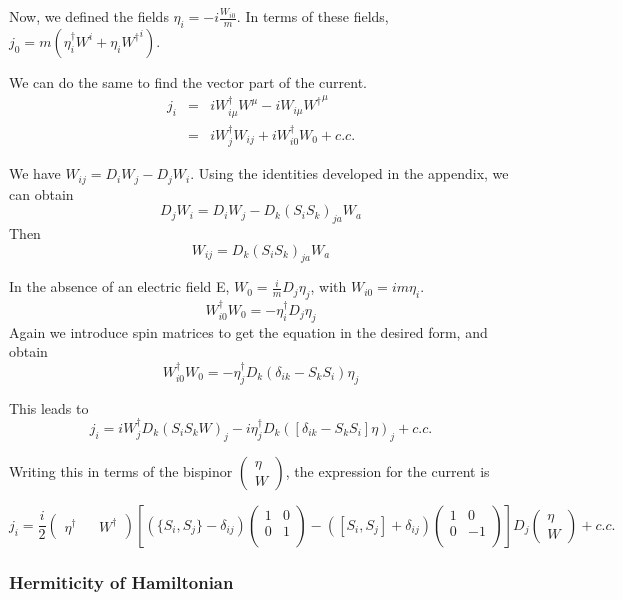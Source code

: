 Now, we defined the fields $\eta_i = -i \frac{W_{i0}}{m}$.  In terms of these fields,
$j_0 =  m (\eta_i^\dagger  W^i + \eta_i {W^\dagger}^i )$. 

We can do the same to find the vector part of the current.
\begin{eqnarray*}
	j_i &=& i W_{i \mu}^\dagger W^{\mu} - i W_{i \mu} {W^{\dagger}}^\mu 	\\
	&=&	i W_j^\dagger W_{ij}  + i W_{i0}^\dagger W_0 + c.c.
\end{eqnarray*}

We have $W_{ij} = D_i W_j - D_j W_i$.  Using the identities developed in the appendix, we can obtain
\[ D_j W_i = D_i W_j - D_k(S_i S_k)_{ja} W_a 	\]
Then
\[ W_{ij} = D_k (S_i S_k)_{ja} W_a 	\]

In the absence of an electric field E, $W_{0} = \frac{i}{m} D_j \eta_j$, with $W_{i0} = i m \eta_i$.
\[	W_{i0}^\dagger W_0 = - \eta_i^\dagger D_j \eta_j 	\]
Again we introduce spin matrices to get the equation in the desired form, and obtain
\[	W_{i0}^\dagger W_0 = - \eta_j^\dagger D_k (\delta_{ik} - S_k S_i) \eta_j 	\]

This leads to
\[ j_i = i W_j^\dagger D_k (S_i S_k W)_j - i \eta_j^\dagger D_k ([\delta_{ik} - S_k S_i]\eta)_j + c.c. \]

Writing this in terms of the bispinor $\begin{pmatrix}\eta \\ W\end{pmatrix}$, the expression for the current is

\begin{equation}	j_i	=
		\frac{i}{2} \begin{pmatrix}\eta^\dagger && W^\dagger \end{pmatrix} \left [
		(\{S_i, S_j\} - \delta_{ij})  
		\begin{pmatrix} 
			1 & 0 \\
			0 & 1 \\ 
		\end{pmatrix}
		- ([S_i, S_j] +\delta_{ij})	\begin{pmatrix} 1 & 0 \\ 0 & -1 \\ \end{pmatrix}
		\right ]
		D_j \begin{pmatrix}\eta \\ W\end{pmatrix} + c.c.
\end{equation}


\subsubsection*{Hermiticity of Hamiltonian}


